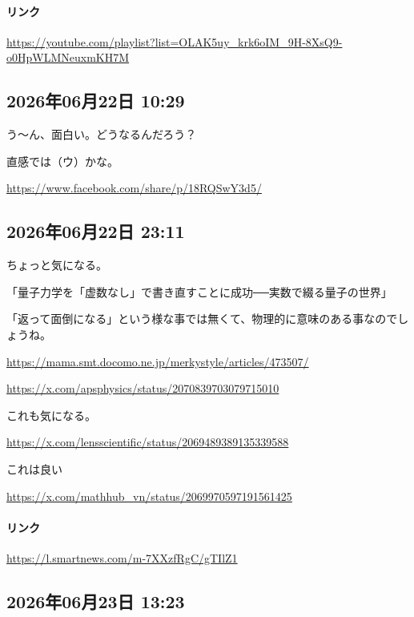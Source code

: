 \documentclass[facebook_diary.tex]{subfiles}
\begin{document}
\paragraph{リンク}
\url{https://youtube.com/playlist?list=OLAK5uy_krk6oIM_9H-8XsQ9-o0HpWLMNeuxmKH7M}

\subsection*{2026年06月22日 10:29}

う〜ん、面白い。どうなるんだろう？

直感では（ウ）かな。


\url{https://www.facebook.com/share/p/18RQSwY3d5/}



\subsection*{2026年06月22日 23:11}

ちょっと気になる。

「量子力学を「虚数なし」で書き直すことに成功──実数で綴る量子の世界」

「返って面倒になる」という様な事では無くて、物理的に意味のある事なのでしょうね。

\url{https://mama.smt.docomo.ne.jp/merkystyle/articles/473507/}




\url{https://x.com/apsphysics/status/2070839703079715010}




これも気になる。

\url{https://x.com/lensscientific/status/2069489389135339588}



これは良い

\url{https://x.com/mathhub_vn/status/2069970597191561425}



\paragraph{リンク}
\url{https://l.smartnews.com/m-7XXzfRgC/gTIlZ1}

\subsection*{2026年06月23日 13:23}
\end{document}
